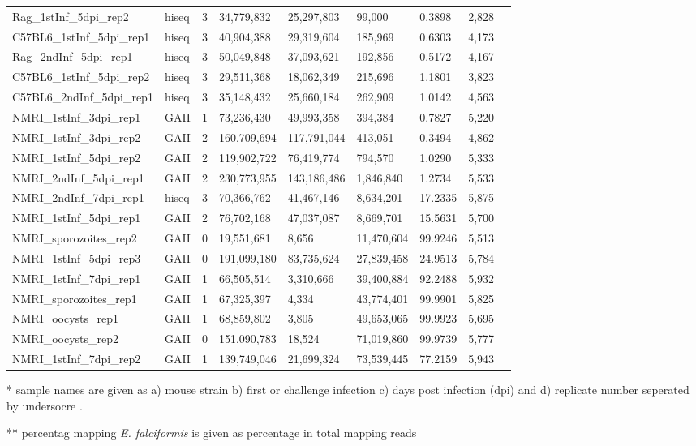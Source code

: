 \documentclass{bmcart}
\begin{document}
\begin{backmatter}
\begin{table}[ht]
\begin{tabular}{lllllllll}
  Rag\_1stInf\_5dpi\_rep2 & hiseq & 3 & 34,779,832 & 25,297,803 & 99,000 & 0.3898 & 2,828 \\ 
  C57BL6\_1stInf\_5dpi\_rep1 & hiseq & 3 & 40,904,388 & 29,319,604 & 185,969 & 0.6303 & 4,173 \\ 
  Rag\_2ndInf\_5dpi\_rep1 & hiseq & 3 & 50,049,848 & 37,093,621 & 192,856 & 0.5172 & 4,167 \\ 
  C57BL6\_1stInf\_5dpi\_rep2 & hiseq & 3 & 29,511,368 & 18,062,349 & 215,696 & 1.1801 & 3,823 \\ 
  C57BL6\_2ndInf\_5dpi\_rep1 & hiseq & 3 & 35,148,432 & 25,660,184 & 262,909 & 1.0142 & 4,563 \\ 
  NMRI\_1stInf\_3dpi\_rep1 & GAII & 1 & 73,236,430 & 49,993,358 & 394,384 & 0.7827 & 5,220 \\ 
  NMRI\_1stInf\_3dpi\_rep2 & GAII & 2 & 160,709,694 & 117,791,044 & 413,051 & 0.3494 & 4,862 \\ 
  NMRI\_1stInf\_5dpi\_rep2 & GAII & 2 & 119,902,722 & 76,419,774 & 794,570 & 1.0290 & 5,333 \\ 
  NMRI\_2ndInf\_5dpi\_rep1 & GAII & 2 & 230,773,955 & 143,186,486 & 1,846,840 & 1.2734 & 5,533 \\ 
  NMRI\_2ndInf\_7dpi\_rep1 & hiseq & 3 & 70,366,762 & 41,467,146 & 8,634,201 & 17.2335 & 5,875 \\ 
  NMRI\_1stInf\_5dpi\_rep1 & GAII & 2 & 76,702,168 & 47,037,087 & 8,669,701 & 15.5631 & 5,700 \\ 
  NMRI\_sporozoites\_rep2 & GAII & 0 & 19,551,681 & 8,656 & 11,470,604 & 99.9246 & 5,513 \\ 
  NMRI\_1stInf\_5dpi\_rep3 & GAII & 0 & 191,099,180 & 83,735,624 & 27,839,458 & 24.9513 & 5,784 \\ 
  NMRI\_1stInf\_7dpi\_rep1 & GAII & 1 & 66,505,514 & 3,310,666 & 39,400,884 & 92.2488 & 5,932 \\ 
  NMRI\_sporozoites\_rep1 & GAII & 1 & 67,325,397 & 4,334 & 43,774,401 & 99.9901 & 5,825 \\ 
  NMRI\_oocysts\_rep1 & GAII & 1 & 68,859,802 & 3,805 & 49,653,065 & 99.9923 & 5,695 \\ 
  NMRI\_oocysts\_rep2 & GAII & 0 & 151,090,783 & 18,524 & 71,019,860 & 99.9739 & 5,777 \\ 
  NMRI\_1stInf\_7dpi\_rep2 & GAII & 1 & 139,749,046 & 21,699,324 & 73,539,445 & 77.2159 & 5,943 \\ 
   \hline
\end{tabular}
\begin{tablenotes}[flushleft]\footnotesize\singlespacing
\item{*} sample names are given as a) mouse strain b) first or challenge
  infection c) days post infection (dpi) and d) replicate number
  seperated by undersocre . \\
\item{**} percentag mapping \textit{E. falciformis} is given as percentage in total mapping reads
\end{tablenotes}
\end{table}
\hspace*{+2.5cm}






\end{backmatter}
\end{document}
